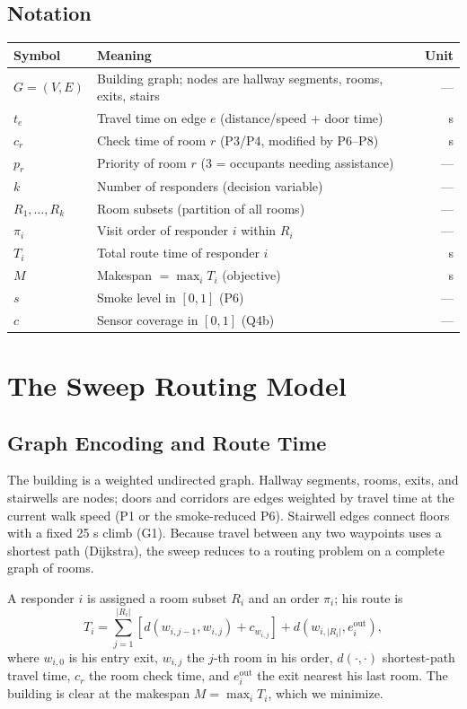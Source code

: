 \documentclass{mcmthesis}
\begin{document}
\subsection{Notation}
\begin{table}[H]
\centering
\small
\begin{tabularx}{\textwidth}{lXr}
\toprule
Symbol & Meaning & Unit \\ \midrule
$G=(V,E)$ & Building graph; nodes are hallway segments, rooms, exits, stairs & --- \\
$t_e$ & Travel time on edge $e$ (distance/speed + door time) & s \\
$c_r$ & Check time of room $r$ (P3/P4, modified by P6--P8) & s \\
$p_r$ & Priority of room $r$ (3 = occupants needing assistance) & --- \\
$k$ & Number of responders (decision variable) & --- \\
$R_1,\dots,R_k$ & Room subsets (partition of all rooms) & --- \\
$\pi_i$ & Visit order of responder $i$ within $R_i$ & --- \\
$T_i$ & Total route time of responder $i$ & s \\
$M$ & Makespan $= \max_i T_i$ (objective) & s \\
$s$ & Smoke level in $[0,1]$ (P6) & --- \\
$c$ & Sensor coverage in $[0,1]$ (Q4b) & --- \\
\bottomrule
\end{tabularx}
\end{table}

\section{The Sweep Routing Model}
\subsection{Graph Encoding and Route Time}
The building is a weighted undirected graph. Hallway segments, rooms, exits, and stairwells are nodes; doors and corridors are edges weighted by travel time at the current walk speed (P1 or the smoke-reduced P6). Stairwell edges connect floors with a fixed 25 s climb (G1). Because travel between any two waypoints uses a shortest path (Dijkstra), the sweep reduces to a routing problem on a complete graph of rooms.

A responder $i$ is assigned a room subset $R_i$ and an order $\pi_i$; his route is
\begin{equation}
T_i = \sum_{j=1}^{|R_i|} \left[ d\left(w_{i,j-1}, w_{i,j}\right) + c_{w_{i,j}} \right] + d\left(w_{i,|R_i|}, e_i^{\text{out}}\right),
\end{equation}
where $w_{i,0}$ is his entry exit, $w_{i,j}$ the $j$-th room in his order, $d(\cdot,\cdot)$ shortest-path travel time, $c_r$ the room check time, and $e_i^{\text{out}}$ the exit nearest his last room. The building is clear at the makespan $M=\max_i T_i$, which we minimize.
\end{document}
